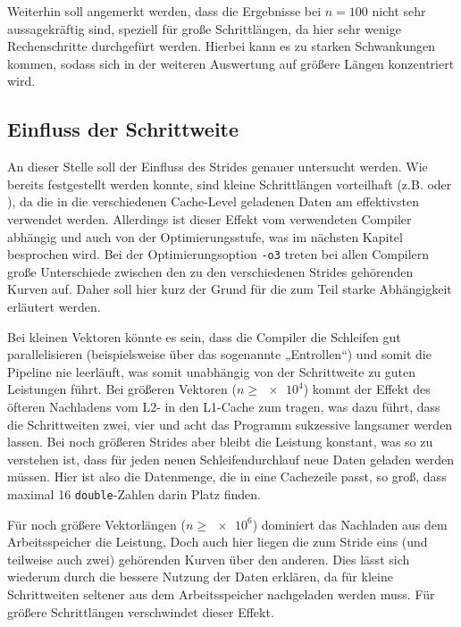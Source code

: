 Weiterhin soll angemerkt werden, dass die Ergebnisse bei $n=100$ nicht sehr
aussagekräftig sind, speziell für große Schrittlängen, da hier sehr wenige Rechenschritte
durchgefürt werden. Hierbei kann es zu starken Schwankungen kommen, sodass sich in
der weiteren Auswertung auf größere Längen konzentriert wird.


\subsection{Einfluss der Schrittweite}
An dieser Stelle soll der Einfluss des Strides genauer untersucht werden. Wie bereits
festgestellt werden konnte, sind kleine Schrittlängen vorteilhaft (z.B. 
oder ), da die in die verschiedenen Cache-Level geladenen Daten am
effektivsten verwendet werden. Allerdings ist dieser Effekt vom verwendeten Compiler
abhängig und auch von der Optimierungsstufe, was im nächsten Kapitel besprochen wird.
Bei der Optimierungsoption \texttt{-o3} treten bei allen Compilern große Unterschiede
zwischen den zu den verschiedenen Strides gehörenden Kurven auf. Daher soll hier kurz 
der Grund für die zum Teil starke Abhängigkeit erläutert werden.

Bei kleinen Vektoren könnte es sein, dass die Compiler die Schleifen gut parallelisieren
(beispielsweise über das sogenannte „Entrollen“) und somit die Pipeline nie
leerläuft, was somit unabhängig von der Schrittweite zu guten Leistungen führt. Bei
größeren Vektoren ($n\ge\num{e4}$) kommt der Effekt des öfteren Nachladens vom L2- in
den L1-Cache zum tragen, was dazu führt, dass die Schrittweiten zwei, vier und acht 
das Programm sukzessive langsamer werden lassen. Bei noch größeren Strides aber bleibt
die Leistung konstant, was so zu verstehen ist, dass für jeden neuen Schleifendurchlauf
neue Daten geladen werden müssen. Hier ist also die Datenmenge, die in eine Cachezeile 
passt, so groß, dass maximal 16 \texttt{double}-Zahlen darin Platz finden.

Für noch größere Vektorlängen ($n\ge \num{e6}$) dominiert das Nachladen aus dem
Arbeitsspeicher die Leistung, Doch auch hier liegen die zum Stride eins (und teilweise
auch zwei) gehörenden Kurven über den anderen. Dies lässt sich wiederum durch die bessere
Nutzung der Daten erklären, da für kleine Schrittweiten seltener aus dem Arbeitsspeicher
nachgeladen werden muss. Für größere Schrittlängen verschwindet dieser Effekt.





